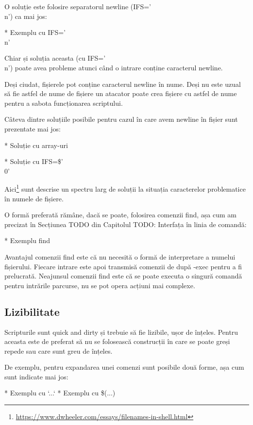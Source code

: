 O soluție este folosire separatorul newline (IFS=’\\n’) ca mai jos:

* Exemplu cu IFS=’\\n’

Chiar și soluția aceasta (cu IFS=’\\n’) poate avea probleme atunci când o intrare
conține caracterul newline.
\begin{note}[NOTĂ]
Deși ciudat, fișierele pot conține caracterul newline în nume. Deși nu este
uzual să fie astfel de nume de fișiere un atacator poate crea fișiere cu
astfel de nume pentru a sabota funcționarea scriptului.
\end{note}

Câteva dintre soluțiile posibile pentru cazul în care avem newline în fișier
sunt prezentate mai jos:

* Soluție cu array-uri

* Soluție cu IFS=\$’\\0’

Aici\footnote{\url{https://www.dwheeler.com/essays/filenames-in-shell.html}}
sunt descrise un spectru larg de soluții la situația caracterelor problematice
în numele de fișiere.

O formă preferată rămâne, dacă se poate, folosirea comenzii find, așa cum am
precizat în Secțiunea TODO din Capitolul TODO: Interfața în linia de comandă:

* Exemplu find

Avantajul comenzii find este că nu necesită o formă de interpretare a numelui
fișierului. Fiecare intrare este apoi transmisă comenzii de după -exec pentru a
fi prelucrată. Neajunsul comenzii find este că se poate executa o singură
comandă pentru intrările parcurse, nu se pot opera acțiuni mai complexe.

\subsection{Lizibilitate}
\label{sec:auto-advancedfunc-readability}

Scripturile sunt quick and dirty și trebuie să fie lizibile, ușor de înțeles.
Pentru aceasta este de preferat să nu se folosească construcții în care se poate
greși repede sau care sunt greu de înțeles.

De exemplu, pentru expandarea unei comenzi sunt posibile două forme, așa cum
sunt indicate mai jos:

* Exemplu cu `...`
* Exemplu cu \$(...)

